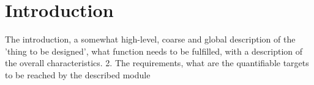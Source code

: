 \chapter{Introduction}

The introduction, a somewhat high-level, coarse and global description of the ’thing to be designed’, what function needs to be fulfilled, with a description of the overall characteristics.
2. The requirements, what are the quantifiable targets to be reached by the described module